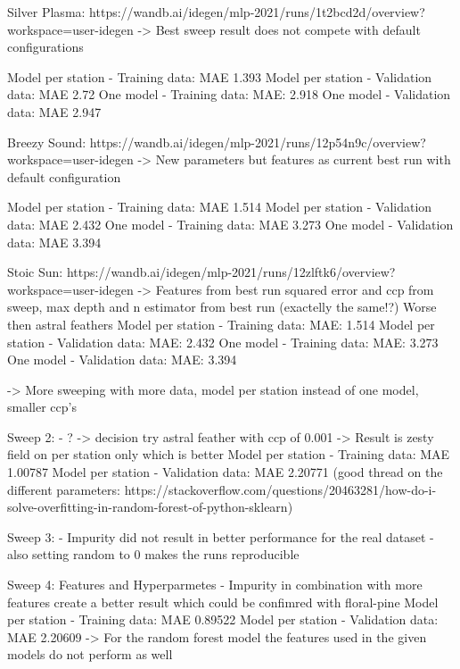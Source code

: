 \documentclass[a4paper]{article}
\begin{document}
    Silver Plasma: https://wandb.ai/idegen/mlp-2021/runs/1t2bcd2d/overview?workspace=user-idegen
    -> Best sweep result does not compete with default configurations

    Model per station - Training data: MAE 1.393
    Model per station - Validation data: MAE 2.72
    One model - Training data: MAE: 2.918
    One model - Validation data: MAE 2.947

    Breezy Sound: https://wandb.ai/idegen/mlp-2021/runs/12p54n9c/overview?workspace=user-idegen
    -> New parameters but features as current best run with default configuration

    Model per station - Training data: MAE 1.514
    Model per station - Validation data: MAE 2.432
    One model - Training data: MAE 3.273
    One model - Validation data: MAE 3.394

    Stoic Sun: https://wandb.ai/idegen/mlp-2021/runs/12zlftk6/overview?workspace=user-idegen
    -> Features from best run squared error and ccp from sweep, max depth and n estimator from best run (exactelly the same!?)
    Worse then astral feathers
    Model per station - Training data: MAE: 1.514
    Model per station - Validation data: MAE: 2.432
    One model - Training data: MAE: 3.273
    One model - Validation data: MAE: 3.394

    -> More sweeping with more data, model per station instead of one model, smaller ccp's

    Sweep 2:
    - ?
    -> decision try astral feather with ccp of 0.001
    -> Result is zesty field on per station only which is better
    Model per station - Training data: MAE 1.00787
    Model per station - Validation data: MAE 2.20771
    (good thread on the different parameters: https://stackoverflow.com/questions/20463281/how-do-i-solve-overfitting-in-random-forest-of-python-sklearn)

    Sweep 3:
    - Impurity did not result in better performance for the real dataset
    - also setting random to 0 makes the runs reproducible

    Sweep 4: Features and Hyperparmetes
    - Impurity in combination with more features create a better result which could be confimred with floral-pine
    Model per station - Training data: MAE 0.89522
    Model per station - Validation data: MAE 2.20609
    -> For the random forest model the features used in the given models do not perform as well

    \subsection*{}
\end{document}
